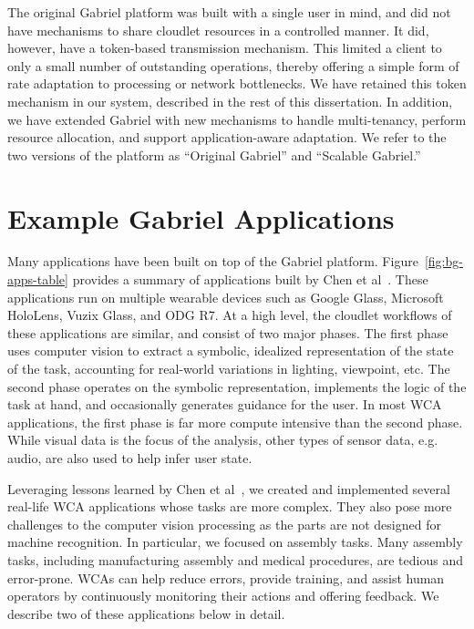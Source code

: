 The original Gabriel platform was built with a single user in mind, and did not
have mechanisms to share cloudlet resources in a controlled manner.  It did,
however, have a token-based transmission mechanism.  This limited a client to
only a small number of outstanding operations, thereby offering a simple form of
rate adaptation to processing or network bottlenecks.  We have retained this
token mechanism in our system, described in the rest of this dissertation. In
addition, we have extended Gabriel with new mechanisms to handle multi-tenancy,
perform resource allocation, and support application-aware adaptation.  We refer
to the two versions of the platform as ``Original Gabriel'' and ``Scalable
Gabriel.''

\section{Example Gabriel Applications}
\label{sec:example-apps}

Many applications have been built on top of the Gabriel platform.
Figure~\ref{fig:bg-apps-table} provides a summary of applications built by Chen
et al~\cite{chen2018application}. These applications run on multiple wearable
devices such as Google Glass, Microsoft HoloLens, Vuzix Glass, and ODG R7. At a
high level, the cloudlet workflows of these applications are similar, and
consist of two major phases. The first phase uses computer vision to extract a
symbolic, idealized representation of the state of the task, accounting for
real-world variations in lighting, viewpoint, etc.  The second phase operates on
the symbolic representation, implements the logic of the task at hand, and
occasionally generates guidance for the user.  In most WCA applications, the
first phase is far more compute intensive than the second phase. While visual
data is the focus of the analysis, other types of sensor data, e.g. audio, are
also used to help infer user state.

Leveraging lessons learned by Chen et al~\cite{chen2018application}, we created
and implemented several real-life WCA applications whose tasks are more complex.
They also pose more challenges to the computer vision processing as the parts
are not designed for machine recognition. In particular, we focused on assembly
tasks. Many assembly tasks, including manufacturing assembly and medical
procedures, are tedious and error-prone. WCAs can help reduce errors, provide
training, and assist human operators by continuously monitoring their actions and
offering feedback. We describe two of these applications below in detail.

